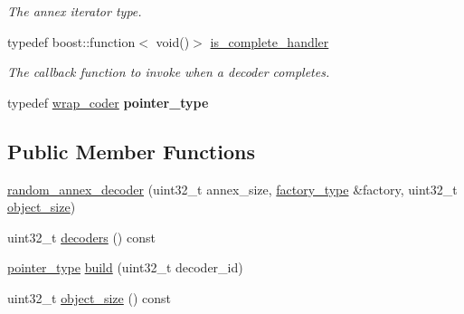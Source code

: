 \begin{DoxyCompactItemize}
\begin{DoxyCompactList}\small\item\em The annex iterator type. \end{DoxyCompactList}\item 
\hypertarget{classkodo_1_1random__annex__decoder_ab4721acd76dbc223b2e46966b543913a}{typedef boost\-::function$<$ void()$>$ \hyperlink{classkodo_1_1random__annex__decoder_ab4721acd76dbc223b2e46966b543913a}{is\-\_\-complete\-\_\-handler}}\label{classkodo_1_1random__annex__decoder_ab4721acd76dbc223b2e46966b543913a}

\begin{DoxyCompactList}\small\item\em The callback function to invoke when a decoder completes. \end{DoxyCompactList}\item 
\hypertarget{classkodo_1_1random__annex__decoder_aad5ac43c9eb997492773190be2ddd9e8}{typedef \hyperlink{classkodo_1_1random__annex__decoder_1_1wrap__coder}{wrap\-\_\-coder} {\bfseries pointer\-\_\-type}}\label{classkodo_1_1random__annex__decoder_aad5ac43c9eb997492773190be2ddd9e8}

\end{DoxyCompactItemize}
\subsection*{Public Member Functions}
\begin{DoxyCompactItemize}
\item 
\hyperlink{classkodo_1_1random__annex__decoder_aaec4ec2f265c4a8ae741e7b2573348ce}{random\-\_\-annex\-\_\-decoder} (uint32\-\_\-t annex\-\_\-size, \hyperlink{classkodo_1_1random__annex__decoder_a68e1a5fbc7128fe60d8905e0ec0fc83c}{factory\-\_\-type} \&factory, uint32\-\_\-t \hyperlink{classkodo_1_1random__annex__decoder_aa63cbf2aae8f7339af18d4cd4aeb49f3}{object\-\_\-size})
\item 
uint32\-\_\-t \hyperlink{classkodo_1_1random__annex__decoder_aa90effdcf8eb8c1c6d6032da8a80356c}{decoders} () const 
\item 
\hyperlink{classkodo_1_1random__annex__decoder_1_1wrap__coder}{pointer\-\_\-type} \hyperlink{classkodo_1_1random__annex__decoder_a9899aedc9bf52b46668eb15958c51cd1}{build} (uint32\-\_\-t decoder\-\_\-id)
\item 
uint32\-\_\-t \hyperlink{classkodo_1_1random__annex__decoder_aa63cbf2aae8f7339af18d4cd4aeb49f3}{object\-\_\-size} () const 
\end{DoxyCompactItemize}
